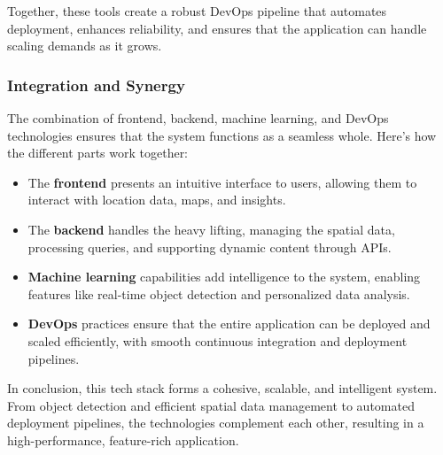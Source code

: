 Together, these tools create a robust DevOps pipeline that automates deployment, enhances reliability, and ensures that the application can handle scaling demands as it grows.

\subsubsection{Integration and Synergy}

The combination of frontend, backend, machine learning, and DevOps technologies ensures that the system functions as a seamless whole. Here's how the different parts work together:

\begin{itemize}
    \item{} The \textbf{frontend} presents an intuitive interface to users, allowing them to interact with location data, maps, and insights.
    \item{} The \textbf{backend} handles the heavy lifting, managing the spatial data, processing queries, and supporting dynamic content through APIs.
    \item{} \textbf{Machine learning} capabilities add intelligence to the system, enabling features like real{-}time object detection and personalized data analysis.
    \item{} \textbf{DevOps} practices ensure that the entire application can be deployed and scaled efficiently, with smooth continuous integration and deployment pipelines.
\end{itemize}

In conclusion, this tech stack forms a cohesive, scalable, and intelligent system. From object detection and efficient spatial data management to automated deployment pipelines, the technologies complement each other, resulting in a high{-}performance, feature{-}rich application.